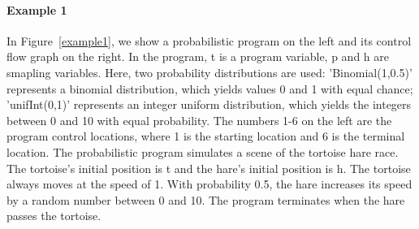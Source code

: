 \documentclass[sigconf,review, anonymous]{acmart}
\begin{document}
\paragraph{Example 1} In Figure~\ref{example1}, we show a probabilistic program on the left and its control flow graph on the right. In the program,  t is a program variable,  p and h are smapling variables. Here, two probability distributions are used: 'Binomial(1,0.5)' represents a binomial distribution, which yields values 0 and 1 with equal chance; 'unifInt(0,1)' represents an integer uniform distribution, which yields the integers between 0 and 10  with equal probability. The numbers 1-6 on the left are the program control locations, where 1 is the starting location and 6 is the terminal location. The probabilistic program simulates a scene of the tortoise hare race. The tortoise's initial position is t and the hare's initial position is h.  The tortoise  always moves at the speed of 1. With probability 0.5, the hare increases its speed by a random number between 0 and 10. The program terminates when the hare passes the tortoise.
\end{document}
